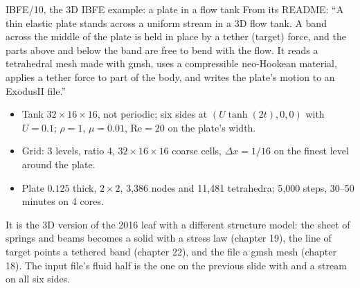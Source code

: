 \documentclass[aspectratio=169,11pt]{beamer}
\begin{document}
\begin{frame}{IBFE/10, the 3D IBFE example: a plate in a flow tank}
\label{fr:ibfe10}
\small From its README: ``A thin elastic plate stands across a uniform stream in a 3D flow tank. A band across the middle of the plate is held in place by a tether (target) force, and the parts above and below the band are free to bend with the flow. It reads a tetrahedral mesh made with gmsh, uses a compressible neo-Hookean material, applies a tether force to part of the body, and writes the plate's motion to an ExodusII file.''
\begin{itemize}\footnotesize
  \item Tank $32\times16\times16$, not periodic; six sides at $(U\tanh(2t), 0, 0)$ with $U = 0.1$; $\rho = 1$, $\mu = 0.01$, $\mathrm{Re} = 20$ on the plate's width.
  \item Grid: 3 levels, ratio 4, $32\times16\times16$ coarse cells, $\Delta x = 1/16$ on the finest level around the plate.
  \item Plate $0.125$ thick, $2\times2$, 3,386 nodes and 11,481 tetrahedra; 5,000 steps, 30--50 minutes on 4 cores.
\end{itemize}
\vspace{1mm}
\footnotesize It is the 3D version of the 2016 leaf with a different structure model: the sheet of springs and beams becomes a solid with a stress law (chapter 19), the line of target points a tethered band (chapter 22), and the  file a gmsh mesh (chapter 18). The input file's fluid half is the one on the previous slide with  and a stream on all six sides.
\end{frame}
\end{document}
